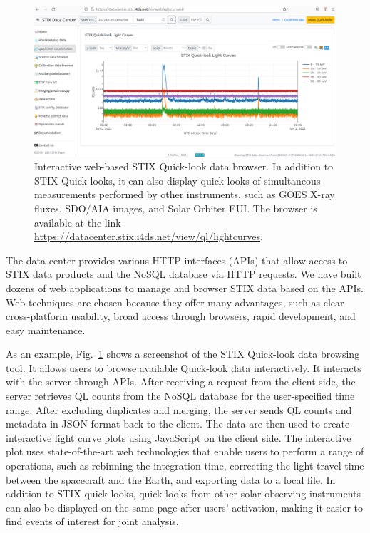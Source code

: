 \documentclass[referee]{preaa} %
\begin{document}
\begin{figure}[ht]
  \centering
  \includegraphics[width=0.7\linewidth]{figures/data-browser.pdf}
  \caption{ 
    Interactive web-based STIX Quick-look data browser. 
    In addition to STIX Quick-looks, it can also display quick-looks of simultaneous measurements 
    performed by other instruments, such as GOES X-ray fluxes, SDO/AIA images, and Solar Orbiter EUI. 
    The browser is available at the link \url{https://datacenter.stix.i4ds.net/view/ql/lightcurves}.}
  \label{fig:qlbrowser}
\end{figure}
The data center provides various HTTP interfaces (APIs) that allow access to STIX data products
and the NoSQL database via HTTP requests. 
We have built dozens of web applications to manage and browser STIX data based on the APIs. 
Web techniques are chosen because they offer many advantages, such as clear cross-platform 
usability, broad access through browsers, rapid development, and easy maintenance.

As an example, Fig.~\ref{fig:qlbrowser} shows a screenshot of the STIX Quick-look data browsing 
tool. It allows users to browse available Quick-look data interactively. It 
interacts with the server through APIs. 
After receiving a request from the client side,
the server retrieves QL counts from the NoSQL database for the user-specified time range. 
After excluding duplicates and merging,  the server sends QL counts and metadata in JSON format back to the client. The data are then used to create interactive light curve plots using JavaScript on the client side. 
The interactive plot uses state-of-the-art web technologies that enable users to perform a range of operations, such as rebinning the integration time, correcting the light travel time between the spacecraft and the Earth, and exporting data to a local file. In addition to STIX quick-looks, quick-looks from other solar-observing instruments can also be displayed on the same page after users' activation, 
making it easier to find events of interest for joint analysis.
\end{document}
